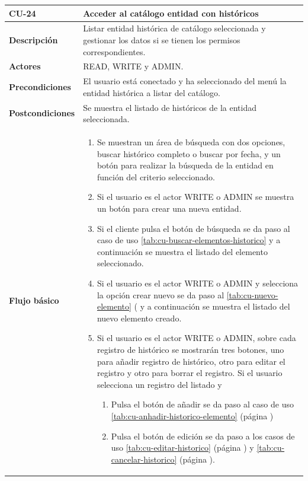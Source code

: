 \begin{table} [H]
    \centering
    \setlength{\leftmargini}{0.4cm}
	\resizebox{14cm}{!} { %
    \begin{tabular}{| m{3cm} | m{11cm} |}   
    \hline
	  \textbf{CU-24} & \textbf{Acceder al catálogo entidad con históricos} \\\hline
	  \textbf{Descripción} & Listar entidad histórica de catálogo seleccionada y gestionar los datos si se tienen los permisos correspondientes. \\\hline
	  \textbf{Actores} & READ, WRITE y ADMIN. \\\hline
	  \textbf{Precondiciones} & El usuario está conectado y ha seleccionado del menú la entidad histórica a listar del catálogo. \\\hline
	  \textbf{Postcondiciones} & Se muestra el listado de históricos de la entidad seleccionada. \\\hline
	  \textbf{Flujo básico} & 
		\begin{enumerate}
	  	\item Se muestran un área de búsqueda con dos opciones, buscar histórico completo o buscar por fecha, y un botón para realizar la búsqueda de la entidad en función del criterio seleccionado.
	  	\item Si el usuario es el actor WRITE o ADMIN se muestra un botón para crear una nueva entidad.
	  	\item Si el cliente pulsa el botón de búsqueda se da paso al caso de uso \ref{tab:cu-buscar-elementos-historico} y a continuación se muestra el listado del elemento seleccionado.
	  	\item Si el usuario es el actor WRITE o ADMIN y selecciona la opción crear nuevo se da paso al \ref{tab:cu-nuevo-elemento} (\pageref{tab:cu-nuevo-elemento} y a continuación se muestra el listado del nuevo elemento creado.
		\item Si el usuario es el actor WRITE o ADMIN, sobre cada registro de histórico se mostrarán tres botones, uno para añadir registro de histórico, otro para editar el registro y otro para borrar el registro. Si el usuario selecciona un registro del listado y
		    \begin{enumerate}
		         \item Pulsa el botón de añadir se da paso al caso de uso \ref{tab:cu-anhadir-historico-elemento} (página \pageref{tab:cu-anhadir-historico-elemento})
		        \item Pulsa el botón de edición se da paso a los casos de uso \ref{tab:cu-editar-historico} (página \pageref{tab:cu-editar-historico}) y \ref{tab:cu-cancelar-historico} (página \pageref{tab:cu-cancelar-historico}).

\end{enumerate}
\end{enumerate}
\end{tabular}}
\end{table}

